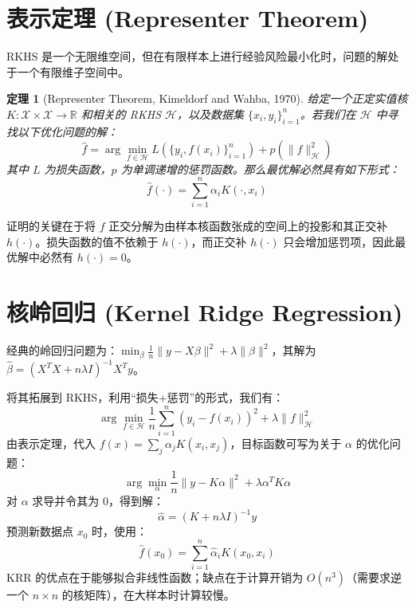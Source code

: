 \documentclass[UTF8]{ctexart}
\newtheorem{theorem}{定理}
\begin{document}
\section{表示定理 (Representer Theorem)}
RKHS 是一个无限维空间，但在有限样本上进行经验风险最小化时，问题的解处于一个有限维子空间中。

\begin{theorem}[Representer Theorem, Kimeldorf and Wahba, 1970]
给定一个正定实值核 $K: \mathcal{X} \times \mathcal{X} \to \mathbb{R}$ 和相关的 RKHS $\mathcal{H}$，以及数据集 $\{x_i, y_i\}_{i=1}^n$。若我们在 $\mathcal{H}$ 中寻找以下优化问题的解：
$$ \hat{f} = \arg\min_{f \in \mathcal{H}} L(\{y_i, f(x_i)\}_{i=1}^n) + p(\|f\|_{\mathcal{H}}^2) $$
其中 $L$ 为损失函数，$p$ 为单调递增的惩罚函数。那么最优解必然具有如下形式：
$$ \hat{f}(\cdot) = \sum_{i=1}^n \alpha_i K(\cdot, x_i) $$
\end{theorem}
证明的关键在于将 $f$ 正交分解为由样本核函数张成的空间上的投影和其正交补 $h(\cdot)$。损失函数的值不依赖于 $h(\cdot)$，而正交补 $h(\cdot)$ 只会增加惩罚项，因此最优解中必然有 $h(\cdot) = 0$。

\section{核岭回归 (Kernel Ridge Regression)}
经典的岭回归问题为：$\min_{\beta} \frac{1}{n} \|y - X\beta\|^2 + \lambda \|\beta\|^2$，其解为 $\hat{\beta} = (X^T X + n\lambda I)^{-1} X^T y$。

将其拓展到 RKHS，利用“损失+惩罚”的形式，我们有：
$$ \arg\min_{f \in \mathcal{H}} \frac{1}{n} \sum_{i=1}^n (y_i - f(x_i))^2 + \lambda \|f\|_{\mathcal{H}}^2 $$
由表示定理，代入 $f(x) = \sum_j \alpha_j K(x_i, x_j)$，目标函数可写为关于 $\alpha$ 的优化问题：
$$ \arg\min_{\alpha} \frac{1}{n} \|y - K\alpha\|^2 + \lambda \alpha^T K \alpha $$
对 $\alpha$ 求导并令其为 0，得到解：
$$ \hat{\alpha} = (K + n\lambda I)^{-1} y $$
预测新数据点 $x_0$ 时，使用：
$$ \hat{f}(x_0) = \sum_{i=1}^n \hat{\alpha}_i K(x_0, x_i) $$
KRR 的优点在于能够拟合非线性函数；缺点在于计算开销为 $O(n^3)$（需要求逆一个 $n \times n$ 的核矩阵），在大样本时计算较慢。
\end{document}
